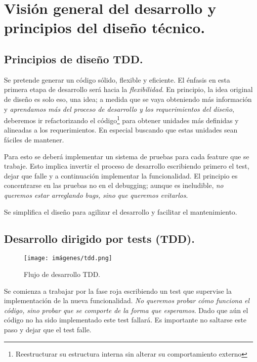 
\section{Visión general del desarrollo y principios del diseño técnico.}\label{principios:vision-general-desarrollo}

\subsection{Principios de diseño TDD.}\label{principios:principios-de-diseno}
Se pretende generar un código sólido, flexible y eficiente. El énfasis en esta primera etapa de desarrollo será hacia la \emph{flexibilidad}. En principio, la idea original de diseño es solo eso, una idea; a medida que se vaya obteniendo más información y \emph{aprendamos más del proceso de desarrollo y los requerimientos del diseño}, deberemos ir refactorizando el código\footnote{Reestructurar su estructura interna sin alterar su comportamiento externo} para obtener unidades más definidas y alineadas a los requerimientos. En especial buscando que estas unidades sean fáciles de mantener.

Para esto se deberá implementar un sistema de pruebas para cada feature que se trabaje. Esto implica invertir el proceso de desarrollo escribiendo primero el test, dejar que falle y a continuación implementar la funcionalidad. El principio es concentrarse en las pruebas no en el \foreignlanguage{english}{debugging}; aunque es ineludible, \emph{no queremos estar arreglando bugs, sino que queremos evitarlos}.

Se simplifica el diseño para agilizar el desarrollo y facilitar el mantenimiento.

\subsection{Desarrollo dirigido por tests (TDD).}\label{principios:TDD}

\begin{figure}[ht]
	\centering
	\texttt{[image: imágenes/tdd.png]}
	\caption{Flujo de desarrollo TDD.}
\end{figure}

Se comienza a trabajar por la fase roja escribiendo un test que supervise la implementación de la nueva funcionalidad. \emph{No queremos probar cómo funciona el código, sino probar que se comporte de la forma que esperamos}. Dado que aún el código no ha sido implementado este test fallará. Es importante no saltarse este paso y dejar que el test falle.

